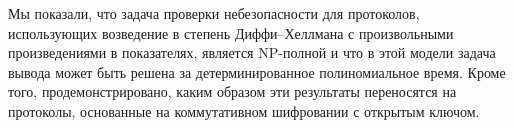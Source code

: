 \conclusion

Мы показали, что задача проверки небезопасности для протоколов,
использующих возведение в степень Диффи–Хеллмана с произвольными
произведениями в показателях, является NP-полной и что в этой
модели задача вывода может быть решена за детерминированное
полиномиальное время.  
Кроме того, продемонстрировано, каким образом эти результаты
переносятся на протоколы, основанные на коммутативном
шифровании с открытым ключом.
